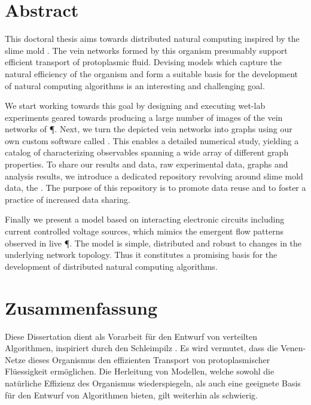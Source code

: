 \null\vfill

\section*{Abstract}
	
	This doctoral thesis aims towards distributed natural computing inspired by the slime mold \Pp. The vein networks formed by this organism presumably support efficient transport of protoplasmic fluid. Devising models which capture the natural efficiency of the organism and form a suitable basis for the development of natural computing algorithms is an interesting and challenging goal.
	
	We start working towards this goal by designing and executing wet-lab experiments geared towards producing a large number of images of the vein networks of \P. Next, we turn the depicted vein networks into graphs using our own custom software called \NEFI. This enables a detailed numerical study, yielding a catalog of characterizing observables spanning a wide array of different graph properties. To share our results and data, \ie raw experimental data, graphs and analysis results, we introduce a dedicated repository revolving around slime mold data, the \SMGR. The purpose of this repository is to promote data reuse and to foster a practice of increased data sharing. 

	Finally we present a model based on interacting electronic circuits including current controlled voltage sources, which mimics the emergent flow patterns observed in live \P. The model is simple, distributed and robust to changes in the underlying network topology. Thus it constitutes a promising basis for the development of distributed natural computing algorithms.

\vfill

\newpage

\null\vfill

\section*{Zusammenfassung}

	Diese Dissertation dient als Vorarbeit f\"ur den Entwurf von verteilten Algorithmen, inspiriert durch den Schleimpilz \Pp. Es wird vermutet, dass die Venen-Netze dieses Organismus den effizienten Transport von protoplasmischer Fl\"uessigkeit erm\"oglichen. Die Herleitung von Modellen, welche sowohl die nat\"urliche Effizienz des Organismus wiederspiegeln, als auch eine geeignete Basis f\"ur den Entwurf von Algorithmen bieten, gilt weiterhin als schwierig.

